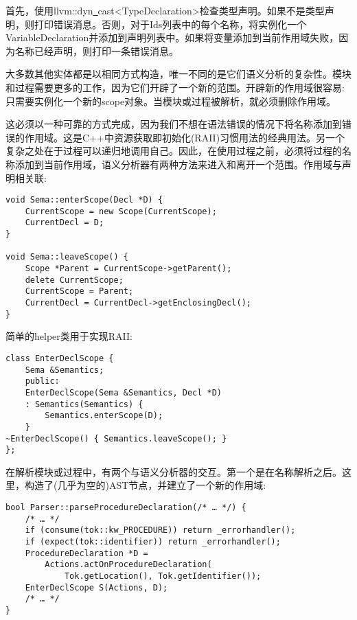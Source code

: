 首先，使用llvm::dyn\underline{~}cast<TypeDeclaration>检查类型声明。如果不是类型声明，则打印错误消息。否则，对于Ids列表中的每个名称，将实例化一个VariableDeclaration并添加到声明列表中。如果将变量添加到当前作用域失败，因为名称已经声明，则打印一条错误消息。\par

大多数其他实体都是以相同方式构造，唯一不同的是它们语义分析的复杂性。模块和过程需要更多的工作，因为它们开辟了一个新的范围。开辟新的作用域很容易:只需要实例化一个新的scope对象。当模块或过程被解析，就必须删除作用域。\par

这必须以一种可靠的方式完成，因为我们不想在语法错误的情况下将名称添加到错误的作用域。这是C++中资源获取即初始化(RAII)习惯用法的经典用法。另一个复杂之处在于过程可以递归地调用自己。因此，在使用过程之前，必须将过程的名称添加到当前作用域，语义分析器有两种方法来进入和离开一个范围。作用域与声明相关联:\par

\begin{lstlisting}[caption={}]
void Sema::enterScope(Decl *D) {
	CurrentScope = new Scope(CurrentScope);
	CurrentDecl = D;
}

void Sema::leaveScope() {
	Scope *Parent = CurrentScope->getParent();
	delete CurrentScope;
	CurrentScope = Parent;
	CurrentDecl = CurrentDecl->getEnclosingDecl();
}
\end{lstlisting}

简单的helper类用于实现RAII:\par

\begin{lstlisting}[caption={}]
class EnterDeclScope {
	Sema &Semantics;
	public:
	EnterDeclScope(Sema &Semantics, Decl *D)
	: Semantics(Semantics) {
		Semantics.enterScope(D);
	}
~EnterDeclScope() { Semantics.leaveScope(); }
};
\end{lstlisting}

在解析模块或过程中，有两个与语义分析器的交互。第一个是在名称解析之后。这里，构造了(几乎为空的)AST节点，并建立了一个新的作用域:\par

\begin{lstlisting}[caption={}]
bool Parser::parseProcedureDeclaration(/* … */) {
	/* … */
	if (consume(tok::kw_PROCEDURE)) return _errorhandler();
	if (expect(tok::identifier)) return _errorhandler();
	ProcedureDeclaration *D =
		Actions.actOnProcedureDeclaration(
			Tok.getLocation(), Tok.getIdentifier());
	EnterDeclScope S(Actions, D);
	/* … */
}
\end{lstlisting}

